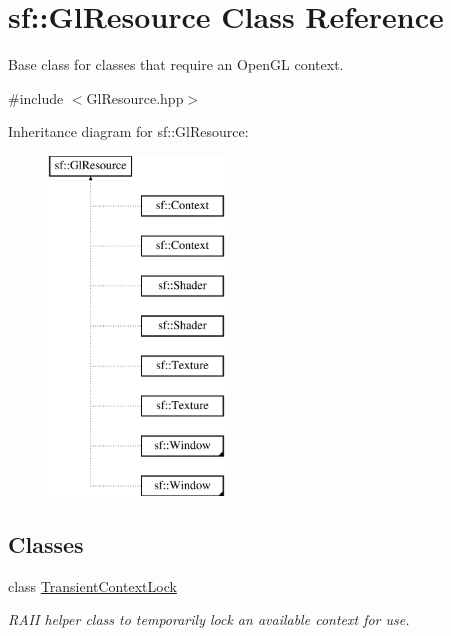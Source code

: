 \hypertarget{classsf_1_1_gl_resource}{\section{sf\-:\-:Gl\-Resource Class Reference}
\label{classsf_1_1_gl_resource}
}


Base class for classes that require an Open\-G\-L context.  




{\ttfamily \#include $<$Gl\-Resource.\-hpp$>$}

Inheritance diagram for sf\-:\-:Gl\-Resource\-:\begin{figure}[H]
\begin{center}
\leavevmode
\includegraphics[height=9.000000cm]{classsf_1_1_gl_resource}
\end{center}
\end{figure}
\subsection*{Classes}
\begin{DoxyCompactItemize}
\item 
class \hyperlink{classsf_1_1_gl_resource_1_1_transient_context_lock}{Transient\-Context\-Lock}
\begin{DoxyCompactList}\small\item\em R\-A\-I\-I helper class to temporarily lock an available context for use. \end{DoxyCompactList}\end{DoxyCompactItemize}
